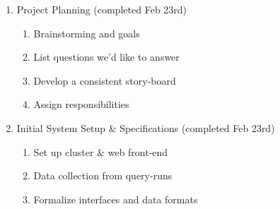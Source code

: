\begin{enumerate}
    \item Project Planning (completed Feb 23rd)
    \begin{enumerate}
        \item Brainstorming and goals
        \item List questions we'd like to answer
        \item Develop a consistent story-board
        \item Assign responsibilities
    \end{enumerate}
    \item Initial System Setup \& Specifications (completed Feb 23rd)
    \begin{enumerate}
        \item Set up cluster \& web front-end
        \item Data collection from query-runs
        \item Formalize interfaces and data formats
    \end{enumerate}

\end{enumerate}




